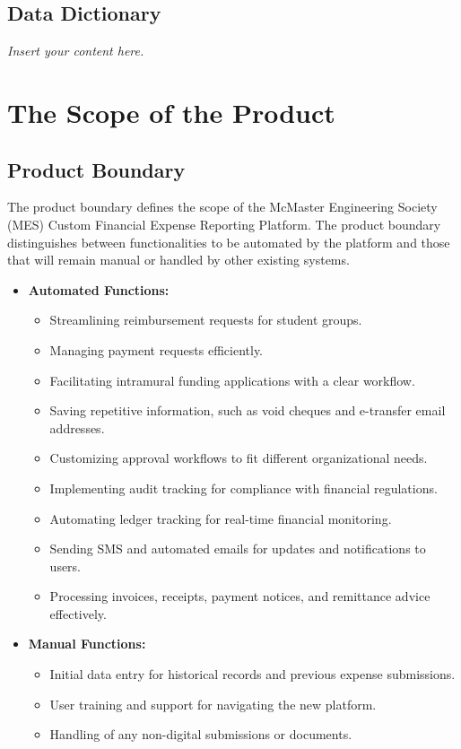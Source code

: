 \documentclass[12pt]{article}
\newcommand{\lips}{\textit{Insert your content here.}}
\begin{document}
\subsection{Data Dictionary}
\lips

\section{The Scope of the Product}

\subsection{Product Boundary}
The product boundary defines the scope of the McMaster Engineering Society (MES) Custom Financial Expense Reporting Platform. The product boundary distinguishes between functionalities to be automated by the platform and those that will remain manual or handled by other existing systems.

\begin{itemize}
    \item \textbf{Automated Functions:}
    \begin{itemize}
        \item Streamlining reimbursement requests for student groups.
        \item Managing payment requests efficiently.
        \item Facilitating intramural funding applications with a clear workflow.
        \item Saving repetitive information, such as void cheques and e-transfer email addresses.
        \item Customizing approval workflows to fit different organizational needs.
        \item Implementing audit tracking for compliance with financial regulations.
        \item Automating ledger tracking for real-time financial monitoring.
        \item Sending SMS and automated emails for updates and notifications to users.
        \item Processing invoices, receipts, payment notices, and remittance advice effectively.
    \end{itemize}
    \item \textbf{Manual Functions:}
    \begin{itemize}
        \item Initial data entry for historical records and previous expense submissions.
        \item User training and support for navigating the new platform.
        \item Handling of any non-digital submissions or documents.
    \end{itemize}
\end{itemize}
\end{document}

